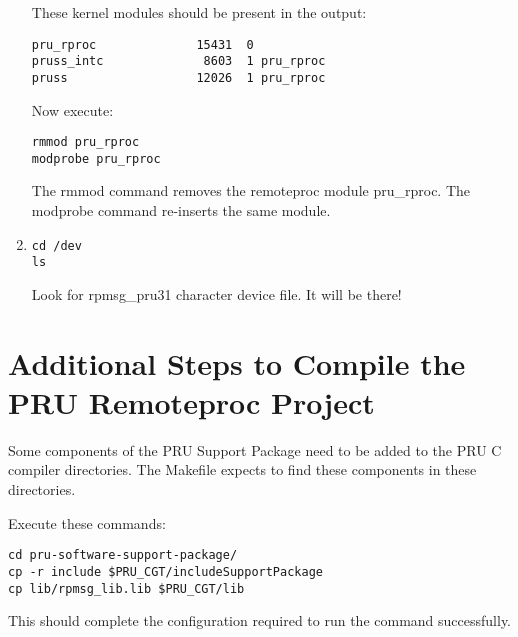 \begin{enumerate}
These kernel modules should be present in the output:

\begin{verbatim}
pru_rproc              15431  0 
pruss_intc              8603  1 pru_rproc
pruss                  12026  1 pru_rproc
\end{verbatim}
Now execute:
\begin{verbatim}
rmmod pru_rproc
modprobe pru_rproc
\end{verbatim}

The rmmod command removes the remoteproc module pru\_rproc.
The modprobe command re-inserts the same module.
\item  
\begin{verbatim}
cd /dev
ls
\end{verbatim} 

Look for rpmsg\_pru31 character device file.  It will be there!
\end{enumerate}

\section{Additional Steps to Compile the PRU Remoteproc Project}

Some components of the PRU Support Package need to be added to the PRU C compiler directories.  The Makefile expects to find these components in these directories.


Execute these commands:

\begin{verbatim}
cd pru-software-support-package/
cp -r include $PRU_CGT/includeSupportPackage
cp lib/rpmsg_lib.lib $PRU_CGT/lib
\end{verbatim}

This should complete the configuration required to run the command successfully.



